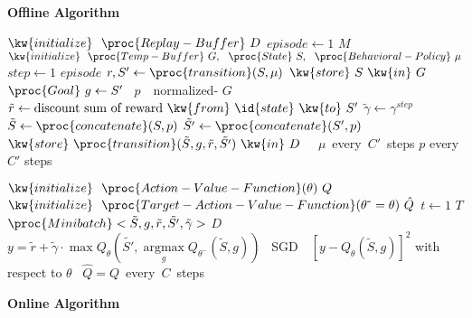 \documentclass[landscape, 8pt, a4paper]{article}
\DeclareMathOperator*{\argmax}{argmax}
\begin{document}
\columnseprule=1pt
\begin{multicols}{2}
\begin{center}

\textbf{\Large Offline Algorithm}

\begin{codebox}
	\zi $\kw{initialize}~~\proc{Replay-Buffer}~D$
	\zi \For $episode\gets 1$ \To $M$ \Do
	\zi $\kw{initialize}~~\proc{Temp-Buffer}~G,~~\proc{State}~S,~~\proc{Behavioral-Policy}~\mu$
	\zi		\For  $step\gets 1$ \To $episode$ \Do
	\zi			$r,S'\gets\proc{transition}(S,\mu)$
	\zi			$\kw{store}~S~\kw{in}~G$
	\zi			$\proc{Goal}~g\gets S'$
	\zi			{}~$p$~~normalized-
	\zi         	\For {}  $G$ \Do
	\zi				$\tilde{r}\gets \mbox{discount sum of reward}~\kw{from}~\id{state}~\kw{to}~S'$
	\zi				$\tilde{\gamma}\gets \gamma^{step}$
	\zi				$\tilde{S}\gets \proc{concatenate}(S,p)$
	\zi				$\tilde{S'}\gets\proc{concatenate}(S',p)$
	\zi				$\kw{store}~\proc{transition}(\tilde{S},g,\tilde{r},\tilde{S'})~\kw{in}~D$
	\End
	\End
	\zi	 		{}~~$\mu$~every~$C'$~steps
	\zi			{}  $p$ every $C'$ steps
	\End
	\End
\end{codebox}
%
\begin{codebox}
	\zi $\kw{initialize}~~\proc{Action-Value-Function}(\theta)~Q$
	\zi $\kw{initialize}~~\proc{Target-Action-Value-Function}(\theta^{\mbox{{}-}}=\theta)~\hat{Q}$
	\zi \For $t\gets 1$ \To $T$ \Do
	\zi	{} $\proc{Minibatch}<\tilde{S},g,\tilde{r},\tilde{S'},\tilde{\gamma}>$  $D$
	\zi $y=\tilde{r}+\tilde{\gamma}\cdot\max Q_{\theta}\left(\tilde{S'}, \argmax\limits_{g} Q_{\theta^{-}}(\tilde{S},g)\right)$
	\zi {}~SGD~~$[y-Q_{\theta}(\tilde{S},g)]^2$ with respect to $\theta$
	\zi {}~$\hat{Q}=Q$~every~$C$~steps
	\End
\end{codebox}

\textbf{\Large Online Algorithm}


\end{center}
\end{multicols}
\end{document}
